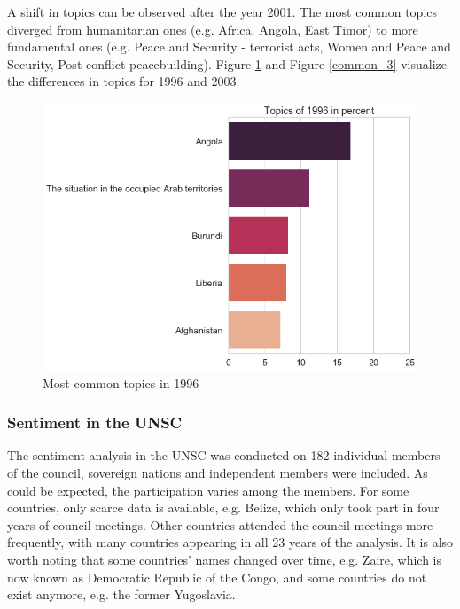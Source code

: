 A shift in topics can be observed after the year 2001. The most common topics diverged from humanitarian ones (e.g. Africa, Angola, East Timor) to more fundamental ones (e.g. Peace and Security - terrorist acts, Women and Peace and Security, Post-conflict peacebuilding). Figure \ref{common_2} and Figure \ref{common_3} visualize the differences in topics for 1996 and 2003. 
\begin{figure}[t]
  \centering
  \includegraphics[width=13cm]{img/1996_most_common_topics.png}
  \caption{Most common topics in 1996}
  \label{common_2}
\end{figure}%

\subsubsection{Sentiment in the UNSC}
The sentiment analysis in the UNSC was conducted on 182 individual members of the council, sovereign nations and independent members were included. As could be expected, the participation varies among the members. For some countries, only scarce data is available, e.g. Belize, which only took part in four years of council meetings. Other countries attended the council meetings more frequently, with many countries appearing in all 23 years of the analysis. It is also worth noting that some countries' names changed over time, e.g. Zaire, which is now known as Democratic Republic of the Congo, and some countries do not exist anymore, e.g. the former Yugoslavia.

